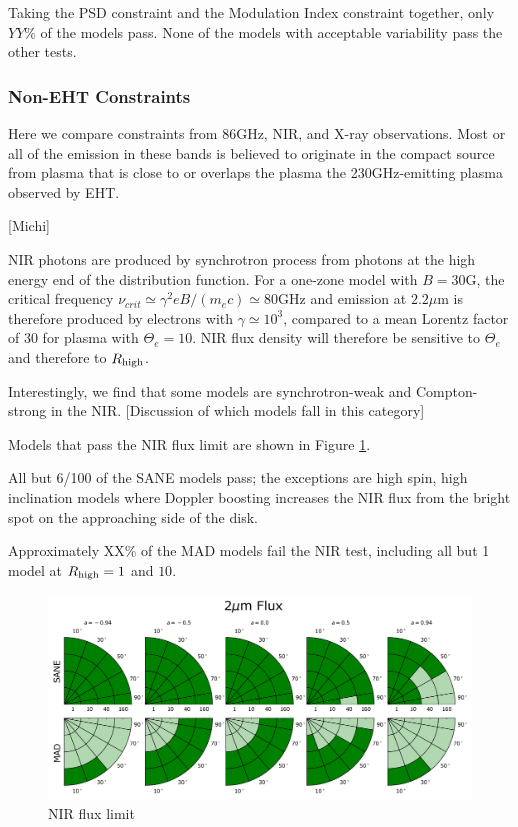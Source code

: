 Taking the PSD constraint and the Modulation Index constraint together, only $YY\%$ of the models pass.  None of the models with acceptable variability pass the other tests.

\subsubsection{Non-EHT Constraints}

Here we compare constraints from 86GHz, NIR, and X-ray observations.  Most or all of the emission in these bands is believed to originate in the compact source from plasma that is close to or overlaps the plasma the 230GHz-emitting plasma observed by EHT.


[Michi]

NIR photons are produced by synchrotron process from photons at the high energy end of the distribution function.  For a one-zone model with $B = 30$G, the  critical frequency $\nu_{crit} \simeq \gamma^2 e B/(m_e c) \simeq 80$GHz and emission at $2.2\mu$m is therefore produced by electrons with $\gamma \simeq 10^3$, compared to a mean Lorentz factor of $30$ for plasma with $\Theta_e = 10$.  NIR flux density will therefore be sensitive to $\Theta_e$ and therefore to $R_\mathrm{high}$.

Interestingly, we find that some models are synchrotron-weak and Compton-strong in the NIR.  [Discussion of which models fall in this category]

Models that pass the NIR flux limit are shown in Figure \ref{fig:cmp_2um_flux}.

All but 6/100 of the SANE models pass; the exceptions are high spin, high inclination models where Doppler boosting increases the NIR flux from the bright spot on the approaching side of the disk.

Approximately XX\% of the MAD models fail the NIR test, including all but 1 model at $R_\mathrm{high} = 1$ and $10$.

\begin{figure}
  \centering
  \includegraphics[width=\columnwidth]{./figures/2um_flux_Constraints.png}
  \caption{NIR flux limit}
  \label{fig:cmp_2um_flux}
\end{figure}

